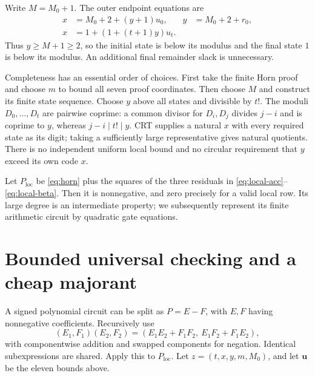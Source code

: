 \documentclass[11pt,letterpaper]{article}
\theoremstyle{definition}\newtheorem{definition}[theorem]{Definition}
\theoremstyle{remark}\newtheorem{remark}[theorem]{Remark}
\begin{document}
Write $M=M_0+1$. The outer endpoint equations are
\begin{align}
 x&=M_0+2+(y+1)u_0,& y&=M_0+2+r_0,\label{eq:endfirst}\\
 x&=1+(1+(t+1)y)u_t.\label{eq:endlast}
\end{align}
Thus $y\ge M+1\ge2$, so the initial state is below its modulus and the
final state $1$ is below its modulus. An additional final remainder
slack is unnecessary.

Completeness has an essential order of choices. First take the finite
Horn proof and choose $m$ to bound all seven proof coordinates. Then
choose $M$ and construct its finite state sequence. Choose $y$ above
all states and divisible by $t!$. The moduli $D_0,\ldots,D_t$ are
pairwise coprime: a common divisor for $D_i,D_j$ divides $j-i$ and is
coprime to $y$, whereas $j-i\mid t!\mid y$. CRT supplies a natural $x$
with every required state as its digit; taking a sufficiently large
representative gives natural quotients. There is no independent uniform
local bound and no circular requirement that $y$ exceed its own code $x$.

Let $P_{\mathrm{loc}}$ be \eqref{eq:horn} plus the squares of the three
residuals in \eqref{eq:local-acc}--\eqref{eq:local-beta}. Then it is
nonnegative, and zero precisely for a valid local row. Its large degree
is an intermediate property; we subsequently represent its finite
arithmetic circuit by quadratic gate equations.

\section{Bounded universal checking and a cheap majorant}
\label{sec:crt}

A signed polynomial circuit can be split as $P=E-F$, with $E,F$
having nonnegative coefficients. Recursively use
\[
 (E_1,F_1)(E_2,F_2)
 =(E_1E_2+F_1F_2,\ E_1F_2+F_1E_2),
\]
with componentwise addition and swapped components for negation.
Identical subexpressions are shared. Apply this to $P_{\mathrm{loc}}$.
Let $z=(t,x,y,m,M_0)$, and let $\mathbf u$ be the eleven bounds above.
\end{document}
